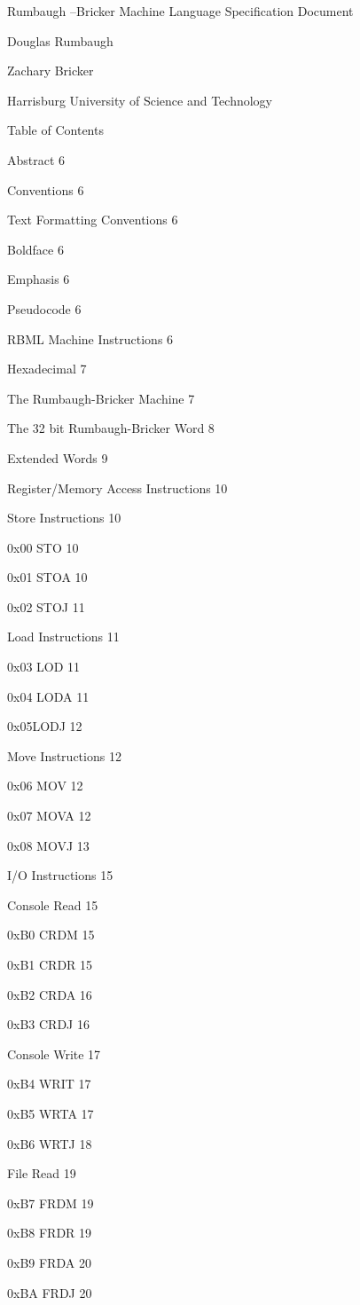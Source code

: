 \documentclass[]{article}
\date{}
\begin{document}
Rumbaugh --Bricker Machine Language Specification Document

Douglas Rumbaugh

Zachary Bricker

Harrisburg University of Science and Technology

Table of Contents

Abstract 6

Conventions 6

Text Formatting Conventions 6

Boldface 6

Emphasis 6

Pseudocode 6

RBML Machine Instructions 6

Hexadecimal 7

The Rumbaugh-Bricker Machine 7

The 32 bit Rumbaugh-Bricker Word 8

Extended Words 9

Register/Memory Access Instructions 10

Store Instructions 10

0x00 STO 10

0x01 STOA 10

0x02 STOJ 11

Load Instructions 11

0x03 LOD 11

0x04 LODA 11

0x05LODJ 12

Move Instructions 12

0x06 MOV 12

0x07 MOVA 12

0x08 MOVJ 13

I/O Instructions 15

Console Read 15

0xB0 CRDM 15

0xB1 CRDR 15

0xB2 CRDA 16

0xB3 CRDJ 16

Console Write 17

0xB4 WRIT 17

0xB5 WRTA 17

0xB6 WRTJ 18

File Read 19

0xB7 FRDM 19

0xB8 FRDR 19

0xB9 FRDA 20

0xBA FRDJ 20
\end{document}
